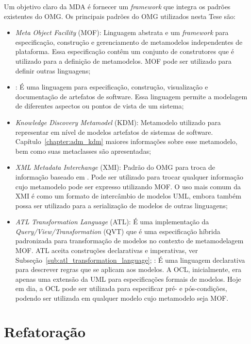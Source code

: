 Um objetivo claro da MDA é fornecer um \textit{framework} que integra os padrões existentes do OMG. Os principais padrões do OMG utilizados nesta Tese são:

\begin{itemize}
\item \textit{Meta Object Facility} (MOF): Linguagem abstrata e um \textit{framework} para especificação, construção e gerenciamento de metamodelos independentes de plataforma. Essa especificação contêm um conjunto de construtores que é utilizado para a definição de metamodelos. MOF pode ser utilizado para definir outras linguagens;
\item {}: É uma linguagem para especificação, construção, visualização e documentação de artefatos de software. Essa linguagem permite a modelagem de diferentes aspectos ou pontos de vista de um sistema;
\item \textit{Knowledge Discovery Metamodel} (KDM): Metamodelo utilizado para representar em nível de modelos artefatos de sistemas de software. Capítulo~\ref{chapter:adm_kdm} maiores informações sobre esse metamodelo, bem como suas metaclasses são apresentadas;
\item \textit{XML Metadata Interchange} (XMI): Padrão do OMG para troca de informação baseado em . Pode ser utilizado para trocar qualquer informação cujo metamodelo pode ser expresso utilizando MOF. O uso mais comum da XMI é como um formato de intercâmbio de modelos UML, embora também possa ser utilizado para a serialização de modelos de outras linguagens;
\item \textit{ATL Transformation Language} (ATL): É uma implementação da \textit{Query/View/Transformation} (QVT) que é uma especificação híbrida padronizada para transformação de modelos no contexto de metamodelagem MOF. ATL aceita construções declarativas e imperativas, ver Subseção~\ref{sub:atl_transformation_language};
: É uma linguagem declarativa para descrever regras que se aplicam aos modelos. A OCL, inicialmente, era apenas uma extensão da UML para especificações formais de modelos. Hoje em dia, a OCL pode ser utilizada para especificar pré- e pós-condições, podendo ser utilizada em qualquer modelo cujo metamodelo seja MOF.
\end{itemize}

\section{Refatoração}\label{sec:refatoracao}

